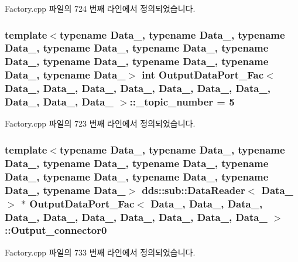 Factory.\+cpp 파일의 724 번째 라인에서 정의되었습니다.

\subsubsection[{\texorpdfstring{\+\_\+topic\+\_\+number}{_topic_number}}]{\setlength{\rightskip}{0pt plus 5cm}template$<$typename Data\+\_, typename Data\+\_, typename Data\+\_, typename Data\+\_, typename Data\+\_, typename Data\+\_, typename Data\+\_, typename Data\+\_, typename Data\+\_, typename Data\+\_$>$ int {\bf Output\+Data\+Port\+\_\+\+Fac}$<$ Data\+\_, Data\+\_, Data\+\_, Data\+\_, Data\+\_, Data\+\_, Data\+\_, Data\+\_, Data\+\_, Data\+\_ $>$\+::\+\_\+topic\+\_\+number = 5\hspace{0.3cm}{\ttfamily [private]}}\hypertarget{classOutputDataPort__Fac_a2e344acab941f42e8ea0aaea28b5d00a}{}\label{classOutputDataPort__Fac_a2e344acab941f42e8ea0aaea28b5d00a}


Factory.\+cpp 파일의 723 번째 라인에서 정의되었습니다.

\subsubsection[{\texorpdfstring{Output\+\_\+connector0}{Output_connector0}}]{\setlength{\rightskip}{0pt plus 5cm}template$<$typename Data\+\_, typename Data\+\_, typename Data\+\_, typename Data\+\_, typename Data\+\_, typename Data\+\_, typename Data\+\_, typename Data\+\_, typename Data\+\_, typename Data\+\_$>$ dds\+::sub\+::\+Data\+Reader$<$ Data\+\_ $>$ $\ast$ {\bf Output\+Data\+Port\+\_\+\+Fac}$<$ Data\+\_, Data\+\_, Data\+\_, Data\+\_, Data\+\_, Data\+\_, Data\+\_, Data\+\_, Data\+\_, Data\+\_ $>$\+::Output\+\_\+connector0}\hypertarget{classOutputDataPort__Fac_af1078cb28c44c09b3d831e073f37fc87}{}\label{classOutputDataPort__Fac_af1078cb28c44c09b3d831e073f37fc87}


Factory.\+cpp 파일의 733 번째 라인에서 정의되었습니다.


